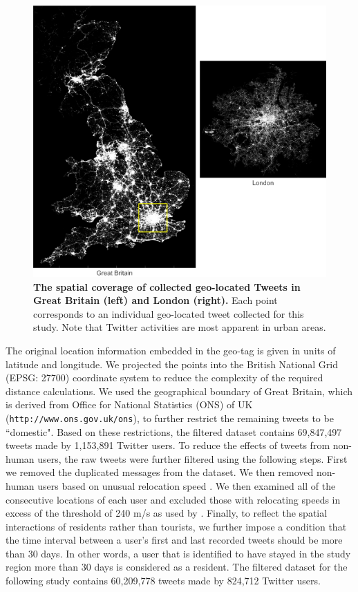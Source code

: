 \documentclass[]{tGIS2e}
\begin{document}
\begin{figure}[ht]
\begin{center}
\includegraphics[width=.8\linewidth]{./figure/S2_twitter_density_Fig_1}
\caption{{\bf The spatial coverage of collected geo-located Tweets in Great Britain (left) and London (right).} Each point corresponds to an individual geo-located tweet collected for this study. Note that Twitter activities are most apparent in urban areas.}
\label{S2_Fig}
\end{center}
\end{figure}
The original location information embedded in the geo-tag is given in units of latitude and longitude.
We projected the points into the British National Grid (EPSG: 27700) coordinate system to reduce the complexity of the required distance calculations. 
We used the geographical boundary of Great Britain, which is derived from Office for National Statistics (ONS) of UK ({\tt{http://www.ons.gov.uk/ons}}), to further restrict the remaining tweets to be ``domestic".
Based on these restrictions, the filtered dataset contains 69,847,497 tweets made by 1,153,891 Twitter users.
To reduce the effects of tweets from non-human users, the raw tweets were further filtered using the following steps.
First we removed the duplicated messages from the dataset.
We then removed non-human users based on unusual relocation speed \citep{hawelka,jurdak2015}. 
We then examined all of the consecutive locations of each user and excluded those with relocating speeds in excess of the threshold of 240 m/s as used by \citep{jurdak2015}.
Finally, to reflect the spatial interactions of residents rather than tourists, we further impose a condition that the time interval between a user's first and last recorded tweets should be more than 30 days.
In other words, a user that is identified to have stayed in the study region more than 30 days is considered as a resident.
The filtered dataset for the following study contains 60,209,778 tweets made by 824,712 Twitter users.
\end{document}
